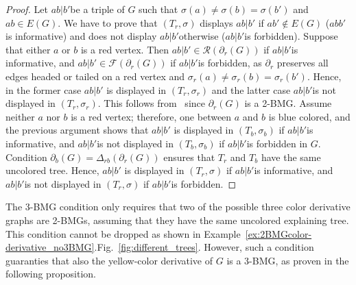 \documentclass[final,3p,times]{elsarticle}
\newcommand{\OLD}[1]{\begingroup\tiny\color{gray}#1\endgroup}
\newcommand{\mh}[1]{\begingroup\color{blue}#1\endgroup}
\begin{document}
\begin{proof}
Let $ab|b'$be a triple of $G$ such that $\sigma(a)\ne \sigma(b)=\sigma(b')$ and $ab\in E(G)$. We have to prove that $(T_r,\sigma)$ displays $ab|b'$ if $ab'\notin E(G)$ ($ abb'$ is informative) and does not display $ab|b'$otherwise ($ab|b'$is forbidden). Suppose that either $a$ or $b$ is a red vertex. Then $ab|b'\in \mathscr{R}(\partial_{r}(G))$ if $ab|b'$is informative, and $ab|b'\in \mathscr{F}(\partial_{r}(G))$ if $ab|b'$is forbidden, as $\partial_{r}$ preserves all edges headed or tailed on a red vertex and $\sigma_r(a)\ne \sigma_r(b)=\sigma_r(b')$. Hence, in the former case $ab|b'$ is displayed in $(T_r,\sigma_r)$ and the latter case $ab|b'$is not displayed in $(T_r,\sigma_r)$. This follows from~\cite[Proposition~2.3]{korchmaros2021quasi} since $\partial_{r}(G)$ is a 2-BMG. Assume neither $a$ nor $b$ is a red vertex; therefore, one between $a$ and $b$ is blue colored, and the previous argument shows that $ab|b'$ is displayed in $(T_b,\sigma_b)$ if $ab|b'$is informative, and $ab|b'$is not displayed in $(T_b,\sigma_b)$ if $ab|b'$is forbidden in $G$. Condition $\partial_b(G)=\Delta_{rb}(\partial_r(G))$ ensures that $T_r$ and $T_b$ have the same uncolored tree. Hence, $ab|b'$ is displayed in $(T_r,\sigma)$ if $ab|b'$is informative, and $ab|b'$is not displayed in $(T_r,\sigma)$ if $ab|b'$is forbidden.
\end{proof}

The 3-BMG condition only requires that two of the possible three color derivative graphs are 2-BMGs, assuming that they have the same uncolored explaining tree. This condition cannot be dropped as shown in \OLD{Example~\ref{ex:2BMGcolor-derivative_no3BMG}.}\mh{Fig.\ \ref{fig:different_trees}.}
 However, such a condition guaranties that also the yellow-color derivative of $G$ is a 3-BMG, as proven in the following proposition. 
\end{document}
